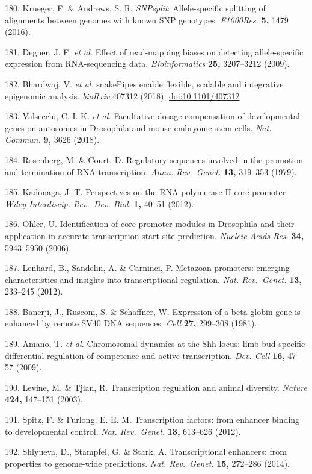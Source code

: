 \documentclass[11pt,twoside]{MPIthesis}
\theoremstyle{definition}
\theoremstyle{definition}
\theoremstyle{definition}
\theoremstyle{remark}
\begin{document}
180. Krueger, F. \& Andrews, S. R. \emph{SNPsplit}: Allele-specific
splitting of alignments between genomes with known SNP genotypes.
\emph{F1000Res.} \textbf{5,} 1479 (2016).

181. Degner, J. F. \emph{et al.} Effect of read-mapping biases on
detecting allele-specific expression from RNA-sequencing data.
\emph{Bioinformatics} \textbf{25,} 3207--3212 (2009).

182. Bhardwaj, V. \emph{et al.} snakePipes enable flexible, scalable and
integrative epigenomic analysis. \emph{bioRxiv} 407312 (2018).
\url{doi:10.1101/407312}

183. Valsecchi, C. I. K. \emph{et al.} Facultative dosage compensation
of developmental genes on autosomes in Drosophila and mouse embryonic
stem cells. \emph{Nat. Commun.} \textbf{9,} 3626 (2018).

184. Rosenberg, M. \& Court, D. Regulatory sequences involved in the
promotion and termination of RNA transcription. \emph{Annu. Rev.~Genet.}
\textbf{13,} 319--353 (1979).

185. Kadonaga, J. T. Perspectives on the RNA polymerase II core
promoter. \emph{Wiley Interdiscip. Rev.~Dev. Biol.} \textbf{1,} 40--51
(2012).

186. Ohler, U. Identification of core promoter modules in Drosophila and
their application in accurate transcription start site prediction.
\emph{Nucleic Acids Res.} \textbf{34,} 5943--5950 (2006).

187. Lenhard, B., Sandelin, A. \& Carninci, P. Metazoan promoters:
emerging characteristics and insights into transcriptional regulation.
\emph{Nat. Rev.~Genet.} \textbf{13,} 233--245 (2012).

188. Banerji, J., Rusconi, S. \& Schaffner, W. Expression of a
beta-globin gene is enhanced by remote SV40 DNA sequences. \emph{Cell}
\textbf{27,} 299--308 (1981).

189. Amano, T. \emph{et al.} Chromosomal dynamics at the Shh locus: limb
bud-specific differential regulation of competence and active
transcription. \emph{Dev. Cell} \textbf{16,} 47--57 (2009).

190. Levine, M. \& Tjian, R. Transcription regulation and animal
diversity. \emph{Nature} \textbf{424,} 147--151 (2003).

191. Spitz, F. \& Furlong, E. E. M. Transcription factors: from enhancer
binding to developmental control. \emph{Nat. Rev.~Genet.} \textbf{13,}
613--626 (2012).

192. Shlyueva, D., Stampfel, G. \& Stark, A. Transcriptional enhancers:
from properties to genome-wide predictions. \emph{Nat. Rev.~Genet.}
\textbf{15,} 272--286 (2014).
\end{document}
